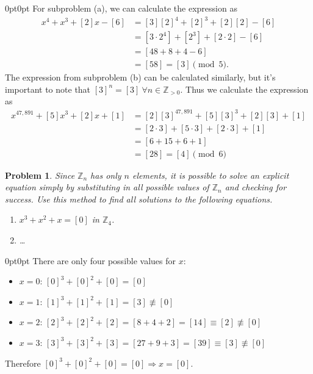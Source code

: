 \documentclass[12pt]{article}
\newtheorem{problem}{Problem}
\numberwithin{problem}{section} %
\theoremstyle{remark}  %
\newenvironment{answer}
    {\begin{adjustwidth}{0pt}{0pt}}
    {\end{adjustwidth}}
\begin{document}
    \begin{answer}
        For subproblem (a), we can calculate the expression as
        \begin{align*}
            [3]x^4+x^3+[2]x-[6] &= [3][2]^4 + [2]^3 + [2][2]-[6] \\
            &= [3\cdot 2^4] + [2^3] + [2\cdot 2] - [6] \\
            &= [48 + 8 + 4 - 6] \\
            &= \boxed{[58] = [3] \pmod{5}}.
        \end{align*}
        The expression from subproblem (b) can be calculated similarly, but it's important to note that $[3]^n=[3]\ \forall n\in\mathbb{Z}_{>0}$. Thus we calculate the expression as
        \begin{align*}
            [2]x^{47,891}+[5]x^3+[2]x+[1] &= [2][3]^{47,891}+[5][3]^3 +[2][3]+[1] \\
            &= [2 \cdot 3] + [5 \cdot 3] + [2 \cdot 3] + [1] \\
            &= [6 + 15 + 6 + 1] \\
            &= \boxed{[28] = [4] \pmod{6}}
        \end{align*}
    \end{answer}
\vspace{5pt}
    \begin{problem}
        Since $\mathbb{Z}_n$ has only $n$ elements, it is possible to solve an explicit equation simply by substituting in all possible values of $\mathbb{Z}_n$ and checking for success. Use this method to find all solutions to the following equations.
        \begin{enumerate}[label=(\alph*)]
            \item $x^3 + x^2 + x = [0]$ in $\mathbb{Z}_4$.
            \item \dots
        \end{enumerate}
    \end{problem}
    \begin{answer}
        There are only four possible values for $x$:
        \begin{itemize}
            \item $x=0$: $[0]^3+[0]^2 + [0] = [0]$
            \item $x=1$: $[1]^3+[1]^2 + [1] = [3] \not\equiv [0]$
            \item $x=2$: $[2]^3+[2]^2 + [2] = [8 + 4 + 2] = [14] \equiv [2] \not\equiv [0]$
            \item $x=3$: $[3]^3+[3]^2 + [3] = [27 + 9 + 3] = [39] \equiv [3] \not\equiv [0]$
        \end{itemize}
        Therefore $[0]^3+[0]^2 + [0] = [0] \Rightarrow x = [0]$.
    \end{answer}
\end{document}

